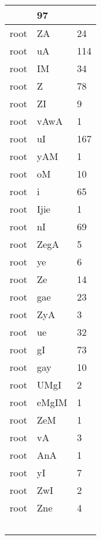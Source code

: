 \documentclass[a4 paper]{article}
\begin{document}
\begin{longtable}{cp{}p{}}
 & 97\\ \midrule root & ZA & 24\\ \midrule root & uA & 114\\ \midrule root & IM & 34\\ \midrule root & Z & 78\\ \midrule root & ZI & 9\\ \midrule root & vAwA & 1\\ \midrule root & uI & 167\\ \midrule root & yAM & 1\\ \midrule root & oM & 10\\ \midrule root & i & 65\\ \midrule root & Ijie & 1\\ \midrule root & nI & 69\\ \midrule root & ZegA & 5\\ \midrule root & ye & 6\\ \midrule root & Ze & 14\\ \midrule root & gae & 23\\ \midrule root & ZyA & 3\\ \midrule root & ue & 32\\ \midrule root & gI & 73\\ \midrule root & gay & 10\\ \midrule root & UMgI & 2\\ \midrule root & eMgIM & 1\\ \midrule root & ZeM & 1\\ \midrule root & vA & 3\\ \midrule root & AnA & 1\\ \midrule root & yI & 7\\ \midrule root & ZwI & 2\\ \midrule root & Zne & 4\\ \
\end{longtable}
\end{document}
